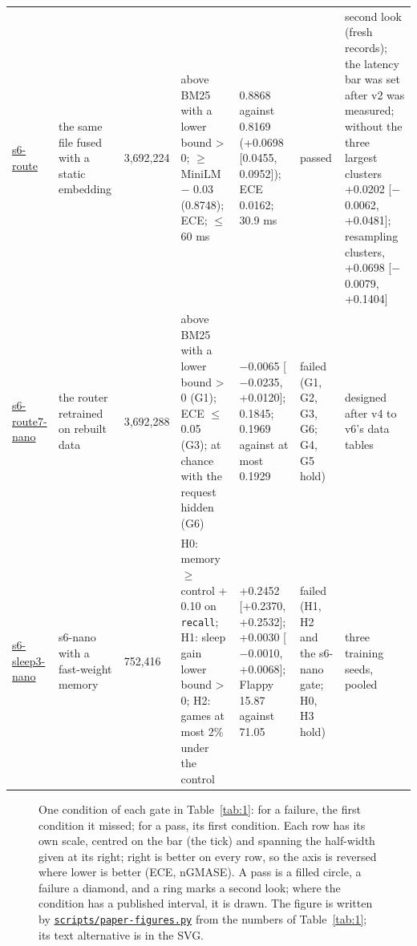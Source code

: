 \documentclass[10pt]{article}
\begin{document}
\begin{table}[p]
\begin{tabularx}{\linewidth}{@{}P{1.75cm}P{1.85cm}R{1.05cm}LLP{1.45cm}L@{}}
\href{https://maxgfr.github.io/skycmd/results/\#s6-route-passed}{s6-route} & the same file fused with a static embedding & 3,692,224 & above BM25 with a lower bound \textgreater{} 0; $\geq$ MiniLM $-$ 0.03 (0.8748); ECE; $\leq$ 60 ms & 0.8868 against 0.8169 (+0.0698 [0.0455, 0.0952]); ECE 0.0162; 30.9 ms & passed & second look (fresh records); the latency bar was set after v2 was measured; without the three largest clusters +0.0202 [$-$0.0062, +0.0481]; resampling clusters, +0.0698 [$-$0.0079, +0.1404] \\
\href{https://maxgfr.github.io/skycmd/results/\#s6-route7-nano-failed}{s6-route7-nano} & the router retrained on rebuilt data & 3,692,288 & above BM25 with a lower bound \textgreater{} 0 (G1); ECE $\leq$ 0.05 (G3); at chance with the request hidden (G6) & $-$0.0065 [$-$0.0235, +0.0120]; 0.1845; 0.1969 against at most 0.1929 & failed (G1, G2, G3, G6; G4, G5 hold) & designed after v4 to v6's data tables \\
\href{https://maxgfr.github.io/skycmd/results/\#s6-sleep3-nano-failed}{s6-sleep3-nano} & s6-nano with a fast-weight memory & 752,416 & H0: memory $\geq$ control + 0.10 on \texttt{recall}; H1: sleep gain lower bound \textgreater{} 0; H2: games at most 2\% under the control & +0.2452 [+0.2370, +0.2532]; +0.0030 [$-$0.0010, +0.0068]; Flappy 15.87 against 71.05 & failed (H1, H2 and the s6-nano gate; H0, H3 hold) & three training seeds, pooled \\
\bottomrule
\end{tabularx}
\end{table}

\begin{figure}[t]
\centering

\caption[One condition of each gate in Table 1: for a failure, the first condition it missed; for a pass, its first condition.]{One condition of each gate in Table~\ref{tab:1}: for a failure, the first condition it missed; for a pass, its first condition. Each row has its own scale, centred on the bar (the tick) and spanning the half-width given at its right; right is better on every row, so the axis is reversed where lower is better (ECE, nGMASE). A pass is a filled circle, a failure a diamond, and a ring marks a second look; where the condition has a published interval, it is drawn. The figure is written by \href{https://github.com/maxgfr/skycmd/blob/main/scripts/paper-figures.py}{\texttt{scripts/\allowbreak{}paper-figures.py}} from the numbers of Table~\ref{tab:1}; its text alternative is in the SVG.}\label{fig:1}
\end{figure}
\end{document}
